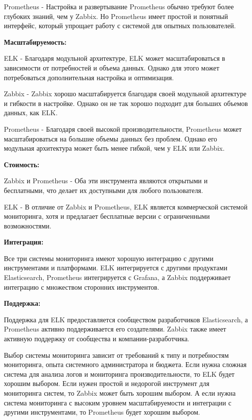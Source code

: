 Prometheus - Настройка и развертывание Prometheus обычно требуют более глубоких знаний, чем у Zabbix. 
Но Prometheus имеет простой и понятный интерфейс, который упрощает работу с системой для опытных пользователей.

\textbf{Масштабируемость:}

ELK - Благодаря модульной архитектуре, ELK может масштабироваться в зависимости от потребностей и объема данных. 
Однако для этого может потребоваться дополнительная настройка и оптимизация.

Zabbix - Zabbix хорошо масштабируется благодаря своей модульной архитектуре и гибкости в настройке. 
Однако он не так хорошо подходит для больших объемов данных, как ELK.

Prometheus - Благодаря своей высокой производительности, Prometheus может масштабироваться на большие объемы 
данных без проблем. Однако его модульная архитектура может быть менее гибкой, чем у ELK или Zabbix.

\textbf{Стоимость:}

Zabbix и Prometheus - Оба эти инструмента являются открытыми и бесплатными, что делает их доступными для любого пользователя.

ELK - В отличие от Zabbix и Prometheus, ELK является коммерческой системой мониторинга, хотя и предлагает 
бесплатные версии с ограниченными возможностями.

\textbf{Интеграция:}

Все три системы мониторинга имеют хорошую интеграцию с другими инструментами и платформами. 
ELK интегрируется с другими продуктами Elasticsearch, Prometheus интегрируется с Grafana, а Zabbix 
поддерживает интеграцию с множеством сторонних инструментов.

\textbf{Поддержка:}

Поддержка для ELK предоставляется сообществом разработчиков Elasticsearch, а Prometheus активно поддерживается его создателями. 
Zabbix также имеет активную поддержку от сообщества и компании-разработчика.

Выбор системы мониторинга зависит от требований к типу и потребностям мониторинга, опыта системного администратора и бюджета.
Если нужна сложная система для анализа логов и мониторинга производительности, то ELK будет хорошим выбором. 
Если нужен простой и недорогой инструмент для мониторинга систем, то Zabbix может быть хорошим выбором. 
А если нужна система мониторинга с высоким уровнем масштабируемости и интеграции с другими инструментами, 
то Prometheus будет хорошим выбором.

